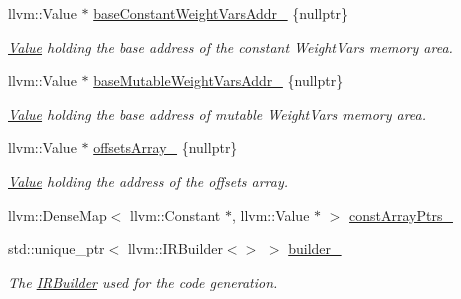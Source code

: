\begin{DoxyCompactItemize}
\mbox{\label{classglow_1_1_l_l_v_m_i_r_gen_a3a8bdf672c68d37cb51f6453d4bd499d}} 
llvm\+::\+Value $\ast$ \hyperlink{classglow_1_1_l_l_v_m_i_r_gen_a3a8bdf672c68d37cb51f6453d4bd499d}{base\+Constant\+Weight\+Vars\+Addr\+\_\+} \{nullptr\}
\begin{DoxyCompactList}\small\item\em \hyperlink{classglow_1_1_value}{Value} holding the base address of the constant Weight\+Vars memory area. \end{DoxyCompactList}\item 
\mbox{\label{classglow_1_1_l_l_v_m_i_r_gen_a8dabbdec1164fe59ab4e2855765066ff}} 
llvm\+::\+Value $\ast$ \hyperlink{classglow_1_1_l_l_v_m_i_r_gen_a8dabbdec1164fe59ab4e2855765066ff}{base\+Mutable\+Weight\+Vars\+Addr\+\_\+} \{nullptr\}
\begin{DoxyCompactList}\small\item\em \hyperlink{classglow_1_1_value}{Value} holding the base address of mutable Weight\+Vars memory area. \end{DoxyCompactList}\item 
\mbox{\label{classglow_1_1_l_l_v_m_i_r_gen_a5bdc9c17fb19d9693593b32bd5685004}} 
llvm\+::\+Value $\ast$ \hyperlink{classglow_1_1_l_l_v_m_i_r_gen_a5bdc9c17fb19d9693593b32bd5685004}{offsets\+Array\+\_\+} \{nullptr\}
\begin{DoxyCompactList}\small\item\em \hyperlink{classglow_1_1_value}{Value} holding the address of the offsets array. \end{DoxyCompactList}\item 
llvm\+::\+Dense\+Map$<$ llvm\+::\+Constant $\ast$, llvm\+::\+Value $\ast$ $>$ \hyperlink{classglow_1_1_l_l_v_m_i_r_gen_a19a5a95f9c36d016cd02c6c1e5872117}{const\+Array\+Ptrs\+\_\+}
\item 
\mbox{\label{classglow_1_1_l_l_v_m_i_r_gen_a1408eac0eb3af218c2bdc2bd031876ec}} 
std\+::unique\+\_\+ptr$<$ llvm\+::\+I\+R\+Builder$<$$>$ $>$ \hyperlink{classglow_1_1_l_l_v_m_i_r_gen_a1408eac0eb3af218c2bdc2bd031876ec}{builder\+\_\+}
\begin{DoxyCompactList}\small\item\em The \hyperlink{classglow_1_1_i_r_builder}{I\+R\+Builder} used for the code generation. \end{DoxyCompactList}\item 
$$
\end{DoxyCompactItemize}
